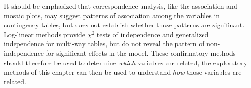 It should be emphasized that correspondence analysis, like the association and
mosaic plots, may suggest patterns of association among the
variables in contingency tables, but does not establish whether
those patterns are significant.
Log-linear methods provide \(\chi^2\) tests of independence
and generalized independence for multi-way tables, but do not
reveal the pattern of non-independence for significant effects
in the model.
These confirmatory methods should therefore be used to determine
\emph{which} variables are related; the exploratory methods of
this chapter can then be used to understand \emph{how} those
variables are related.
